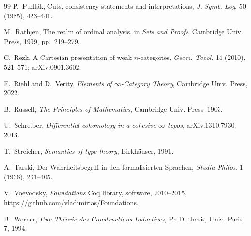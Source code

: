 \documentclass[11pt]{article}
\theoremstyle{plain}
\theoremstyle{definition}
\begin{document}
\begin{thebibliography}{99}
P.~Pudl\'ak,
\newblock Cuts, consistency statements and interpretations,
\newblock \emph{J. Symb. Log.} 50 (1985), 423--441.

M.~Rathjen,
\newblock The realm of ordinal analysis,
\newblock in \emph{Sets and Proofs}, Cambridge Univ. Press, 1999, pp.~219--279.

C.~Rezk,
\newblock A Cartesian presentation of weak $n$-categories,
\newblock \emph{Geom. Topol.} 14 (2010), 521--571; arXiv:0901.3602.

E.~Riehl and D.~Verity,
\newblock \emph{Elements of $\infty$-Category Theory},
\newblock Cambridge Univ. Press, 2022.

B.~Russell,
\newblock \emph{The Principles of Mathematics},
\newblock Cambridge Univ. Press, 1903.

U.~Schreiber,
\newblock \emph{Differential cohomology in a cohesive $\infty$-topos},
\newblock arXiv:1310.7930, 2013.

T.~Streicher,
\newblock \emph{Semantics of type theory},
\newblock Birkh\"auser, 1991.

A.~Tarski,
\newblock Der Wahrheitsbegriff in den formalisierten Sprachen,
\newblock \emph{Studia Philos.} 1 (1936), 261--405.

V.~Voevodsky,
\newblock \emph{Foundations} Coq library,
\newblock software, 2010--2015,
\newblock \url{https://github.com/vladimirias/Foundations}.

B.~Werner,
\newblock \emph{Une Th\'eorie des Constructions Inductives},
\newblock Ph.D. thesis, Univ. Paris 7, 1994.

\end{thebibliography}
\end{document}
